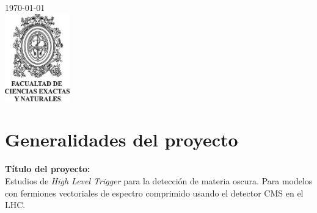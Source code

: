 \begin{titlepage}


{\large \today}\\[0.5cm] %


\includegraphics[width=2.8cm]{udea_fcen.jpg}\\[4cm] %
 

\vfill %

\end{titlepage}

\tableofcontents %

\cleardoublepage





\section{Generalidades del proyecto}

\textbf{Título del proyecto:}\\
Estudios de \textit{High Level Trigger} para la detección de materia oscura. Para modelos con fermiones vectoriales de espectro comprimido usando el detector CMS en el LHC.
\\

